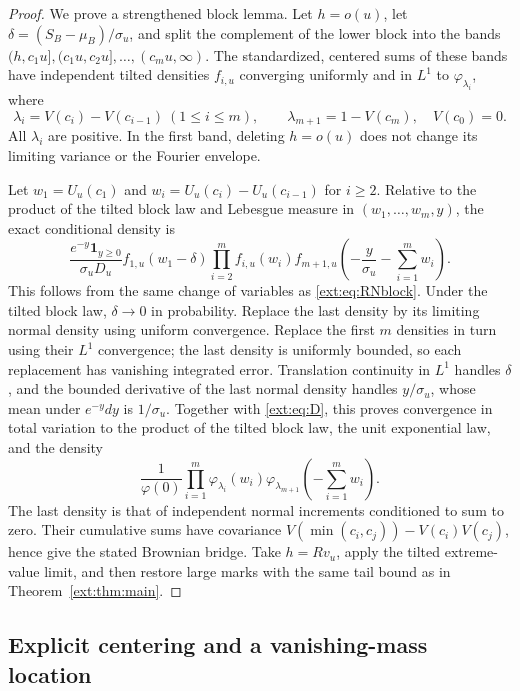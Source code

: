 \documentclass[11pt]{article}
\theoremstyle{definition}
\theoremstyle{remark}
\begin{document}
\begin{proof}
We prove a strengthened block lemma.  Let $h=o(u)$, let
$\delta=(S_B-\mu_B)/\sigma_u$, and split the complement of the lower
block into the bands
$(h,c_1u],(c_1u,c_2u],\ldots,(c_mu,\infty)$.
The standardized, centered sums of these bands have independent tilted
densities $f_{i,u}$ converging uniformly and in $L^1$ to
$\varphi_{\lambda_i}$, where
\[
 \lambda_i=V(c_i)-V(c_{i-1})\ (1\le i\le m),\qquad
 \lambda_{m+1}=1-V(c_m),\quad V(c_0)=0.
\]
All $\lambda_i$ are positive.  In the first band, deleting $h=o(u)$
does not change its limiting variance or the Fourier envelope.

Let $w_1=U_u(c_1)$ and $w_i=U_u(c_i)-U_u(c_{i-1})$ for $i\ge2$.
Relative to the product of the tilted block law and Lebesgue measure
in $(w_1,\ldots,w_m,y)$, the exact conditional density is
\begin{equation}\label{ext:eq:bulkfactor}
 \frac{e^{-y}\mathbf1_{y\ge0}}{\sigma_uD_u}
 f_{1,u}(w_1-\delta)
 \prod_{i=2}^m f_{i,u}(w_i)
 f_{m+1,u}\!\left(-\frac y{\sigma_u}-\sum_{i=1}^mw_i\right).
\end{equation}
This follows from the same change of variables as
\eqref{ext:eq:RNblock}.  Under the tilted block law, $\delta\to0$
in probability.  Replace the last density by its limiting normal
density using uniform convergence.  Replace the first $m$ densities
in turn using their $L^1$ convergence; the last density is uniformly
bounded, so each replacement has vanishing integrated error.
Translation continuity in $L^1$ handles $\delta$, and the bounded
derivative of the last normal density handles $y/\sigma_u$, whose
mean under $e^{-y}dy$ is $1/\sigma_u$.
Together with \eqref{ext:eq:D}, this proves convergence in total
variation to the product of the tilted block law, the unit exponential
law, and the density
\[
 \frac1{\varphi(0)}
 \prod_{i=1}^m\varphi_{\lambda_i}(w_i)
 \varphi_{\lambda_{m+1}}\!\left(-\sum_{i=1}^mw_i\right).
\]
The last density is that of independent normal increments conditioned
to sum to zero.  Their cumulative sums have covariance
$V(\min(c_i,c_j))-V(c_i)V(c_j)$, hence give the stated Brownian bridge.
Take $h=Rv_u$, apply the tilted extreme-value limit, and then restore
large marks with the same tail bound as in Theorem~\ref{ext:thm:main}.
\end{proof}

\subsection{Explicit centering and a vanishing-mass location}
\end{document}
